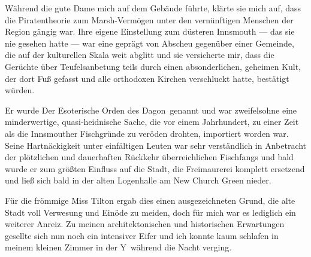 Während die gute Dame mich auf dem Gebäude führte, klärte sie mich auf, dass die Piratentheorie zum Marsh-Vermögen unter den vernünftigen Menschen der Region gängig war. Ihre eigene Einstellung zum düsteren Innsmouth --- das sie nie gesehen hatte --- war eine geprägt von Abscheu gegenüber einer Gemeinde, die auf der kulturellen Skala weit abglitt und sie versicherte mir, dass die Gerüchte über Teufelsanbetung teils durch einen absonderlichen, geheimen Kult, der dort Fuß gefasst und alle orthodoxen Kirchen verschluckt hatte, bestätigt würden.

Er wurde \glqq Der Esoterische Orden des Dagon\grqq\ genannt und war zweifelsohne eine minderwertige, quasi-heidnische Sache, die vor einem Jahrhundert, zu einer Zeit als die Innsmouther Fischgründe zu veröden drohten, importiert worden war. Seine Hartnäckigkeit unter einfältigen Leuten war sehr verständlich in Anbetracht der plötzlichen und dauerhaften Rückkehr überreichlichen Fischfangs und bald wurde er zum größten Einfluss auf die Stadt, die Freimaurerei komplett ersetzend und ließ sich bald in der alten Logenhalle am New Church Green nieder.

Für die frömmige Miss Tilton ergab dies einen ausgezeichneten Grund, die alte Stadt voll Verwesung und Einöde zu meiden, doch für mich war es lediglich ein weiterer Anreiz. Zu meinen architektonischen und historischen Erwartungen gesellte sich nun noch ein intensiver Eifer und ich konnte kaum schlafen in meinem kleinen Zimmer in der \glqq Y\grqq\ während die Nacht verging.

